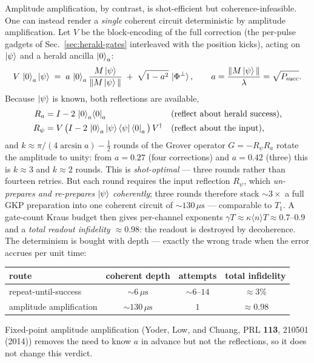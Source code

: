 \documentclass[11pt]{article}
\begin{document}
Amplitude amplification, by contrast, is shot-efficient but coherence-infeasible. One can instead render a
\emph{single} coherent circuit deterministic by amplitude amplification. Let $V$ be the block-encoding
of the full correction (the per-pulse gadgets of Sec.~\ref{sec:herald-gates} interleaved with the
position kicks), acting on $\ket\psi$ and a herald ancilla $\ket0_a$:
\begin{equation}
V\,\ket0_a\ket\psi \;=\; a\,\ket0_a\frac{M\ket\psi}{\|M\ket\psi\|}\;+\;\sqrt{1-a^2}\,\ket{\Phi^\perp},
\qquad a=\frac{\|M\ket\psi\|}{\lambda}=\sqrt{P_{\mathrm{succ}}}.
\end{equation}
Because $\ket\psi$ is known, both reflections are available,
\begin{align}
R_a &= I - 2\,\ket0_a\!\bra0_a &&\text{(reflect about herald success),}\\
R_\psi &= V\,\big(I - 2\,\ket0_a\ket\psi\bra\psi\bra0_a\big)\,V^\dagger
      &&\text{(reflect about the input),}
\end{align}
and $k\approx \pi/(4\arcsin a)-\tfrac12$ rounds of the Grover operator $G=-R_\psi R_a$ rotate the
amplitude to unity: from $a=0.27$ (four corrections) and $a=0.42$ (three) this is $k\approx3$ and
$k\approx2$ rounds. This is \emph{shot-optimal} --- three rounds rather than fourteen retries. But each
round requires the input reflection $R_\psi$, which \emph{un-prepares and re-prepares} $\ket\psi$
\emph{coherently}; three rounds therefore stack $\sim\!3\times$ a full GKP preparation into one coherent
circuit of $\sim\!130\,\mu\mathrm{s}$ --- comparable to $T_1$. A gate-count Kraus budget then gives
per-channel exponents $\gamma T\approx\kappa\langle n\rangle T\approx0.7$--$0.9$ and a \emph{total
readout infidelity $\approx0.98$}: the readout is destroyed by decoherence. The determinism is bought
with depth --- exactly the wrong trade when the error accrues per unit time:
\begin{center}
\begin{tabular}{lccc}
\toprule
route & coherent depth & attempts & total infidelity\\
\midrule
repeat-until-success & $\sim\!6\,\mu\mathrm{s}$ & $\sim\!6$--$14$ & $\approx3\%$\\
amplitude amplification & $\sim\!130\,\mu\mathrm{s}$ & $1$ & $\approx0.98$\\
\bottomrule
\end{tabular}
\end{center}
Fixed-point amplitude amplification (Yoder, Low, and Chuang, PRL \textbf{113}, 210501 (2014)) removes
the need to know $a$ in advance but not the reflections, so it does not change this verdict.
\end{document}
